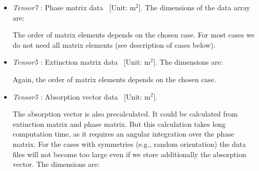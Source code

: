 \begin{itemize}
  The angular grids have to satisfy the following conditions:
  \begin{itemize}
  \item They have to be equidistant. 
  \item The value of the data must be the same for the first and the
    last grid-point . This condition is required for the integration routine.
  \item If we only have to store a part of the grid, for example
     only from 0\degree to 90\degree, these two values
    (0\degree, 90\degree) must be grid-points.
  \end{itemize}
  
\item {\sl Tensor7} : Phase matrix data
  \EnsAvr\PhaMat\ [Unit: m$^2$]. The dimensions of the data array are:  
  
  
  The order of matrix elements depends on the chosen case. For most
  cases we do not need all matrix elements (see description of cases
  below).

\item {\sl Tensor5} : Extinction matrix data
  \EnsAvr\ExtMat\ [Unit: m$^2$]. The dimensions are: 

  
  Again, the order of matrix elements depends on the chosen case.

\item {\sl Tensor5} : Absorption vector data
  \EnsAvr\AbsVec\ [Unit: m$^2$]. 
  
  The absorption vector is also precalculated. It could be calculated
  from extinction matrix and phase matrix. But this calculation takes
  long computation time, as it requires an angular integration over
  the phase matrix. For the cases with symmetries (e.g., random
  orientation) the data files will not become too large even if we
  store additionally the absorption vector. The dimensions are: 
  
\end{itemize}

